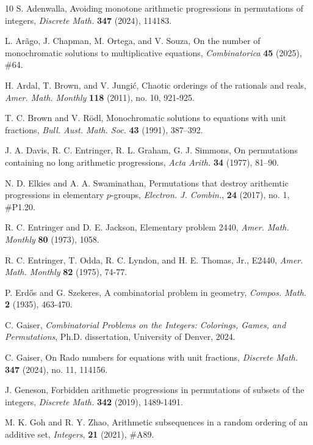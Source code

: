 \documentclass[11pt]{article}
\theoremstyle{definition}
\begin{document}
\begin{thebibliography}{10}
 S. Adenwalla, Avoiding monotone arithmetic progressions in permutations of integers, \textit{Discrete Math.} \textbf{347} (2024), 114183.

 L. Ar\~{a}go, J. Chapman, M. Ortega, and V. Souza, On the number of monochromatic solutions to multiplicative equations, \textit{Combinatorica} \textbf{45} (2025), \#64.

 H. Ardal, T. Brown, and V. Jungi\'{c}, Chaotic orderings of the rationals and reals, \textit{Amer. Math. Monthly} \textbf{118} (2011), no. 10, 921-925.

 T. C. Brown and V. R\"{o}dl, Monochromatic solutions to equations with unit fractions, \textit{Bull. Aust. Math. Soc.} \textbf{43} (1991), 387–392. 

 J. A. Davis, R. C. Entringer, R. L. Graham, G. J. Simmons, On permutations containing no long arithmetic progressions, \textit{Acta Arith.} \textbf{34} (1977), 81–90.

 N. D. Elkies and A. A. Swaminathan, Permutations that destroy arithemtic progressions in elementary $p$-groups, \textit{Electron. J. Combin.}, \textbf{24} (2017), no. 1, \#P1.20.

 R. C. Entringer and D. E. Jackson, Elementary problem 2440, \textit{Amer. Math. Monthly} \textbf{80} (1973), 1058.

 R. C. Entringer, T. Odda, R. C. Lyndon, and H. E. Thomas, Jr., E2440, \textit{Amer. Math. Monthly} \textbf{82} (1975), 74-77.

 P. Erd\H{o}s and G. Szekeres, A combinatorial problem in geometry, \textit{Compos. Math.} \textbf{2} (1935), 463-470.

 C. Gaiser, \textit{Combinatorial Problems on the Integers: Colorings, Games, and Permutations}, Ph.D. dissertation, University of Denver, 2024.

 C. Gaiser, On Rado numbers for equations with unit fractions, \textit{Discrete Math.} \textbf{347} (2024), no. 11, 114156.

 J. Geneson, Forbidden arithmetic progressions in permutations of subsets
of the integers, \textit{Discrete Math.} \textbf{342} (2019), 1489-1491.

 M. K. Goh and R. Y. Zhao, Arithmetic subsequences in a random ordering of an additive set, \textit{Integers}, \textbf{21} (2021), \#A89.


\end{thebibliography}
\end{document}
